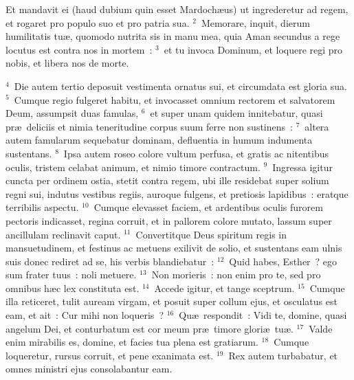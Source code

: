 \lettrine[lines=3,image=true,loversize=0.05,lraise=-0.03]{E}{}t mandavit ei (haud dubium quin esset Mardoch\ae us) ut ingrederetur ad regem, et rogaret pro populo suo et pro patria sua.
${}^{2}$~Memorare, inquit, dierum humilitatis tu\ae , quomodo nutrita sis in manu mea, quia Aman secundus a rege locutus est contra nos in mortem~:
${}^{3}$~et tu invoca Dominum, et loquere regi pro nobis, et libera nos de morte.


${}^{4}$~Die autem tertio deposuit vestimenta ornatus sui, et circumdata est gloria sua.
${}^{5}$~Cumque regio fulgeret habitu, et invocasset omnium rectorem et salvatorem Deum, assumpsit duas famulas,
${}^{6}$~et super unam quidem innitebatur, quasi pr\ae\ deliciis et nimia teneritudine corpus suum ferre non sustinens~:
${}^{7}$~altera autem famularum sequebatur dominam, defluentia in humum indumenta sustentans.
${}^{8}$~Ipsa autem roseo colore vultum perfusa, et gratis ac nitentibus oculis, tristem celabat animum, et nimio timore contractum.
${}^{9}$~Ingressa igitur cuncta per ordinem ostia, stetit contra regem, ubi ille residebat super solium regni sui, indutus vestibus regiis, auroque fulgens, et pretiosis lapidibus~: eratque terribilis aspectu.
${}^{10}$~Cumque elevasset faciem, et ardentibus oculis furorem pectoris indicasset, regina corruit, et in pallorem colore mutato, lassum super ancillulam reclinavit caput.
${}^{11}$~Convertitque Deus spiritum regis in mansuetudinem, et festinus ac metuens exilivit de solio, et sustentans eam ulnis suis donec rediret ad se, his verbis blandiebatur~:
${}^{12}$~Quid habes, Esther~? ego sum frater tuus~: noli metuere.
${}^{13}$~Non morieris~: non enim pro te, sed pro omnibus h\ae c lex constituta est.
${}^{14}$~Accede igitur, et tange sceptrum.
${}^{15}$~Cumque illa reticeret, tulit auream virgam, et posuit super collum ejus, et osculatus est eam, et ait~: Cur mihi non loqueris~?
${}^{16}$~Qu\ae\ respondit~: Vidi te, domine, quasi angelum Dei, et conturbatum est cor meum pr\ae\ timore glori\ae\ tu\ae .
${}^{17}$~Valde enim mirabilis es, domine, et facies tua plena est gratiarum.
${}^{18}$~Cumque loqueretur, rursus corruit, et pene exanimata est.
${}^{19}$~Rex autem turbabatur, et omnes ministri ejus consolabantur eam.

